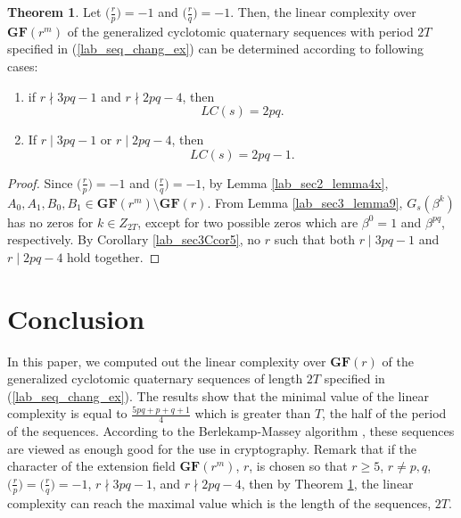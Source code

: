 \documentclass{mcom-l}
\theoremstyle{definition}
\newtheorem{sec3CThm05}[sec3thm1]{Theorem}
\numberwithin{equation}{section}
\begin{document}
    \begin{sec3CThm05}\label{lab_sec3CThm05}
     Let $ \bigl(\tfrac{r}{p}\bigr) =-1$ and $ \bigl(\tfrac{r}{q}\bigr) =-1$. Then, the linear complexity over $ \mathbf{GF}(r^{m}) $ of the generalized cyclotomic quaternary sequences with period $ 2T $ specified in (\ref{lab_seq_chang_ex}) can be determined according to following cases:
     \begin{enumerate}
     \item if $  r\nmid 3pq-1 $ and $ r\nmid 2pq-4 $, then 
      \begin{equation*}
       LC(s)=2pq.
     \end{equation*}
      \item If $  r\mid 3pq-1 $ or $ r\mid 2pq-4 $, then 
          \begin{equation*}
           LC(s)=2pq-1.
         \end{equation*}
     \end{enumerate}
        
    \end{sec3CThm05}
   \begin{proof}
   Since $ \bigl(\tfrac{r}{p}\bigr) =-1$ and $ \bigl(\tfrac{r}{q}\bigr) =-1$, by Lemma \ref{lab_sec2_lemma4x}, $ A_{0},A_{1},B_{0},B_{1}\in \mathbf{GF}(r^{m})\setminus \mathbf{GF}(r)$. From Lemma \ref{lab_sec3_lemma9}, $ G_{s}(\beta^{k}) $ has no zeros for $ k\in Z_{2T} $, except for two possible zeros which are $ \beta^{0} =1$ and $ \beta^{pq}$, respectively. By Corollary \ref{lab_sec3Ccor5}, no $ r $ such that both $ r\mid 3pq-1 $ and $ r\mid 2pq-4 $ hold together.
   \end{proof}
 
    
 \section{Conclusion}
 In this paper, we computed out the linear complexity over $ \mathbf{GF}(r) $  of the  generalized cyclotomic quaternary sequences of length $ 2T $ specified in (\ref{lab_seq_chang_ex}). The results show that the minimal value of the linear complexity  is equal to $ \tfrac{5pq+p+q+1}{4} $ which is greater than $ T $, the half of the period of the sequences. According to the Berlekamp-Massey algorithm \cite{B5}, these sequences are viewed as enough good for the use in cryptography. Remark that if the character of the extension field $ \mathbf{GF}(r^{m}) $, $ r $, is chosen so that $ r\geq 5 $, $ r\ne p,q $, $ \bigl(\tfrac{r}{p}\bigr)=\bigl(\tfrac{r}{q}\bigr)=-1 $, $ r\nmid 3pq-1 $, and $ r\nmid 2pq-4 $, then by Theorem \ref{lab_sec3CThm05}, the linear complexity can reach the maximal value which is the length of the sequences, $ 2T $.
\end{document}
